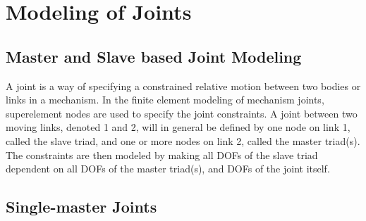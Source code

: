 %
%

%
%

\chapter{Modeling of Joints}
\label{c:Modeling of Joints}

\section{Master and Slave based Joint Modeling}

A joint is a way of specifying a constrained relative motion between two bodies
or links in a mechanism.
In the finite element modeling of mechanism joints, superelement nodes are used
to specify the joint constraints.
A joint between two moving links, denoted 1 and 2, will in general be defined by
one node on link 1, called the slave triad, and one or more nodes on link 2,
called the master triad(s).
The constraints are then modeled by making all DOFs of the slave triad
dependent on all DOFs of the master triad(s), and DOFs of the joint itself.


\section{Single-master Joints}


